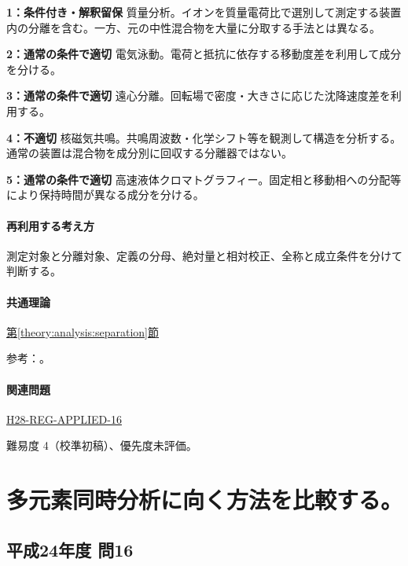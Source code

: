 \noindent\textbf{1：条件付き・解釈留保} 質量分析。イオンを質量電荷比で選別して測定する装置内の分離を含む。一方、元の中性混合物を大量に分取する手法とは異なる。\par

\noindent\textbf{2：通常の条件で適切} 電気泳動。電荷と抵抗に依存する移動度差を利用して成分を分ける。\par

\noindent\textbf{3：通常の条件で適切} 遠心分離。回転場で密度・大きさに応じた沈降速度差を利用する。\par

\noindent\textbf{4：不適切} 核磁気共鳴。共鳴周波数・化学シフト等を観測して構造を分析する。通常の装置は混合物を成分別に回収する分離器ではない。\par

\noindent\textbf{5：通常の条件で適切} 高速液体クロマトグラフィー。固定相と移動相への分配等により保持時間が異なる成分を分ける。\par

\paragraph{再利用する考え方} 測定対象と分離対象、定義の分母、絶対量と相対校正、全称と成立条件を分けて判断する。

\paragraph{共通理論} \hyperref[theory:analysis:separation]{第\ref*{theory:analysis:separation}節}

\par 参考：\cite{analysis49_ms_ref}。

\paragraph{関連問題} \hyperref[q:h28-reg-applied-16]{H28-REG-APPLIED-16}

\par 難易度 4（校準初稿）、優先度未評価。

\section{多元素同時分析に向く方法を比較する。}

\subsection{平成24年度 問16}
\label{q:h24-reg-applied-16}

